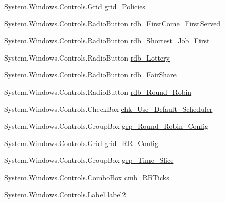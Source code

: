 \begin{DoxyCompactItemize}
System.\+Windows.\+Controls.\+Grid \hyperlink{class_c_p_u___o_s___simulator_1_1_operating_system_main_window_a70a570b7188592c1066eccb3ff6b97f3}{grid\+\_\+\+Policies}
\item 
System.\+Windows.\+Controls.\+Radio\+Button \hyperlink{class_c_p_u___o_s___simulator_1_1_operating_system_main_window_a929f7f488fb80ae6459510ad3334fddb}{rdb\+\_\+\+First\+Come\+\_\+\+First\+Served}
\item 
System.\+Windows.\+Controls.\+Radio\+Button \hyperlink{class_c_p_u___o_s___simulator_1_1_operating_system_main_window_ae5bfde3cdd33e7fb8c973fc33ca58752}{rdb\+\_\+\+Shortest\+\_\+\+Job\+\_\+\+First}
\item 
System.\+Windows.\+Controls.\+Radio\+Button \hyperlink{class_c_p_u___o_s___simulator_1_1_operating_system_main_window_ad9756edfc9b0ce93336c779551675ba3}{rdb\+\_\+\+Lottery}
\item 
System.\+Windows.\+Controls.\+Radio\+Button \hyperlink{class_c_p_u___o_s___simulator_1_1_operating_system_main_window_af80c8b728e40265c61586b298e8640ef}{rdb\+\_\+\+Fair\+Share}
\item 
System.\+Windows.\+Controls.\+Radio\+Button \hyperlink{class_c_p_u___o_s___simulator_1_1_operating_system_main_window_a5be51435049a03c98c57e035eff181ec}{rdb\+\_\+\+Round\+\_\+\+Robin}
\item 
System.\+Windows.\+Controls.\+Check\+Box \hyperlink{class_c_p_u___o_s___simulator_1_1_operating_system_main_window_a8861f5f8ba68cf8eb0a07ef0528dccba}{chk\+\_\+\+Use\+\_\+\+Default\+\_\+\+Scheduler}
\item 
System.\+Windows.\+Controls.\+Group\+Box \hyperlink{class_c_p_u___o_s___simulator_1_1_operating_system_main_window_a1a5a0b0e438e5300a445ffe9ee3bf67d}{grp\+\_\+\+Round\+\_\+\+Robin\+\_\+\+Config}
\item 
System.\+Windows.\+Controls.\+Grid \hyperlink{class_c_p_u___o_s___simulator_1_1_operating_system_main_window_a626ad676e978db5c0d52825764e68ea5}{grid\+\_\+\+R\+R\+\_\+\+Config}
\item 
System.\+Windows.\+Controls.\+Group\+Box \hyperlink{class_c_p_u___o_s___simulator_1_1_operating_system_main_window_a09854a80dc1796d59c66a12415e64c8c}{grp\+\_\+\+Time\+\_\+\+Slice}
\item 
System.\+Windows.\+Controls.\+Combo\+Box \hyperlink{class_c_p_u___o_s___simulator_1_1_operating_system_main_window_a599d396665359bf3ff8c1a9a9e220229}{cmb\+\_\+\+R\+R\+Ticks}
\item 
System.\+Windows.\+Controls.\+Label \hyperlink{class_c_p_u___o_s___simulator_1_1_operating_system_main_window_a28c78c8e714c58223e338c29f89fda83}{label2}

\end{DoxyCompactItemize}
